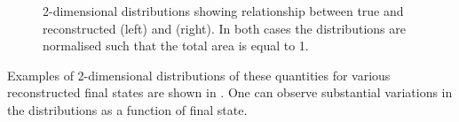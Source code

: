 \begin{figure}[h]
	\begin{minipage}[t]{.5\linewidth}
		\begin{adjustbox}{max totalsize=\linewidth, center}
			
		\end{adjustbox}	
	\end{minipage}
	\hfill
	\begin{minipage}[t]{.5\linewidth}
		\begin{adjustbox}{max totalsize=\linewidth, center}
			
		\end{adjustbox}
	\end{minipage}
	\caption[True vs. reconstructed \evis (left) and \pvis (right)]{2-dimensional distributions showing relationship between true and reconstructed \evis (left) and \pvis (right). In both cases the distributions are normalised such that the total area is equal to 1.}
	\label{fig:visibleTrueReco}
\end{figure}

Examples of 2-dimensional distributions of these quantities for various reconstructed final states are shown in .
One can observe substantial variations in the distributions as a function of final state.

